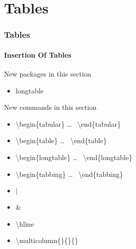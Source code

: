 \section{Tables}

\begin{frame}
\frametitle{Tables}
\framesubtitle{Insertion Of Tables}

\begin{exampleblock}{New packages in this section}
\begin{itemize}
\item longtable
\end{itemize}
\end{exampleblock}

\begin{block}{New commands in this section}
\begin{itemize}
\item \color{unibablueI}\textbackslash begin\color{black}\{tabular\} \dots
~\color{unibablueI}\textbackslash end\color{black}\{tabular\}
\item \color{unibablueI}\textbackslash begin\color{black}\{table\} \dots
~\color{unibablueI}\textbackslash end\color{black}\{table\}
\item \color{unibablueI}\textbackslash begin\color{black}\{longtable\} \dots
~\color{unibablueI}\textbackslash end\color{black}\{longtable\}
\item \color{unibablueI}\textbackslash begin\color{black}\{tabbing\} \dots
~\color{unibablueI}\textbackslash end\color{black}\{tabbing\}
\item \color{nounibaredI}$|$\color{black}
\item \color{nounibaredI}\& \color{black}
\item \color{nounibaredI}\textbackslash hline\color{black}
\item \color{nounibaredI}\textbackslash multicolumn\color{black}\{\}\{\}\{\}
\end{itemize}
\end{block}

\end{frame}

